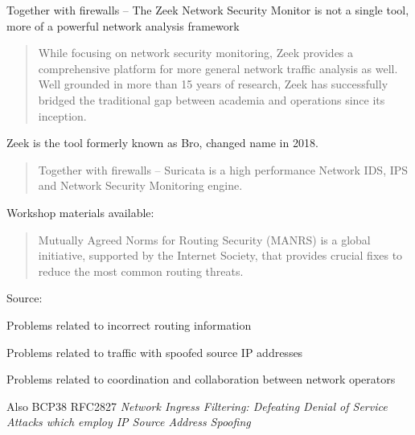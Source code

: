 \documentclass[Screen16to9,17pt]{foils}
\begin{document}
Together with firewalls -- The Zeek Network Security Monitor is not a single tool, more of a powerful network analysis framework


\begin{quote}
While focusing on network security monitoring, Zeek provides a comprehensive platform for more general network traffic analysis as well. Well grounded in more than 15 years of research, Zeek has successfully bridged the traditional gap between academia and operations since its inception.
\end{quote}

Zeek is the tool formerly known as Bro, changed name in 2018. 




\begin{quote}
Together with firewalls -- Suricata is a high performance Network IDS, IPS and Network Security Monitoring engine.
\end{quote}


Workshop materials available:\\
{\small{}}




\begin{quote}
  Mutually Agreed Norms for Routing Security (MANRS) is a global initiative, supported by the Internet Society, that provides crucial fixes to reduce the most common routing threats. ﻿
\end{quote}
Source: {\small{}}

\begin{list2}
\item Problems related to incorrect routing information
\item Problems related to traffic with spoofed source IP addresses
\item Problems related to coordination and collaboration between network operators
\item Also BCP38 RFC2827 \emph{Network Ingress Filtering: Defeating Denial of Service Attacks
which employ IP Source Address Spoofing}
\end{list2}
\end{document}
